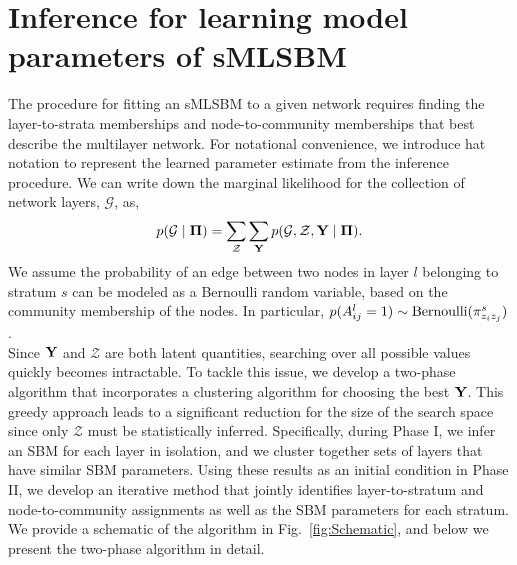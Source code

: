 \section{Inference for learning model parameters of sMLSBM}
\indent The procedure for fitting an sMLSBM to a given network requires finding the layer-to-strata memberships and node-to-community memberships that best describe the multilayer network. For notational convenience, we introduce hat notation to represent the learned parameter estimate from the inference procedure. We can write down the marginal likelihood for the collection of network layers, $\mathcal{G}$, as,
\begin{equation}
\label{eq1}
p(\mathcal{G}\mid {\boldsymbol \Pi})=\sum_{\mathcal Z}\sum_{{\bf Y}}p(\mathcal{G},{\mathcal Z},{\bf Y} \mid {\boldsymbol \Pi}).
\end{equation}
We assume the probability of an edge between two nodes in layer $l$ belonging to stratum $s$ can be modeled as a Bernoulli random variable, based on the community membership of the nodes. In particular, $p({A}^{l}_{ij}=1)\sim \text{Bernoulli}({\bf \pi}_{z_{i}z_{j}}^{s})$. \\
\indent Since ${\bf Y}$ and ${\mathcal Z}$ are both latent quantities, searching over all possible values quickly becomes intractable. To tackle this issue, we develop a two-phase algorithm that incorporates a clustering algorithm for choosing the best $\bf Y$. This greedy approach leads to a significant reduction for the size of the search space since only $\mathcal Z$ must be statistically inferred. Specifically, during Phase I, we infer an SBM for each layer in isolation, and we cluster together sets of layers that have similar SBM parameters. Using these results as an initial condition in Phase II, we develop an iterative method that jointly identifies layer-to-stratum and node-to-community assignments as well as the SBM parameters for each stratum. We provide a schematic of the algorithm in Fig.~\ref{fig:Schematic}, and below we present the two-phase algorithm in detail.


